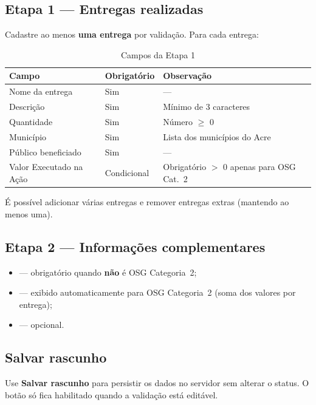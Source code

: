 \documentclass[11pt,a4paper]{article}
\begin{document}
\subsection{Etapa 1 — Entregas realizadas}

Cadastre ao menos \textbf{uma entrega} por validação. Para cada entrega:

\begin{table}[htbp]
  \centering
  \guiaTableStretch
  \caption{Campos da Etapa 1}
  \begin{tabularx}{\textwidth}{@{}L{4.2cm} C{2.4cm} Y@{}}
    \toprule
    \textbf{Campo} & \textbf{Obrigatório} & \textbf{Observação} \\
    \midrule
    Nome da entrega & Sim & --- \\
    Descrição & Sim & Mínimo de 3 caracteres \\
    Quantidade & Sim & Número $\geq$ 0 \\
    Município & Sim & Lista dos municípios do Acre \\
    Público beneficiado & Sim & --- \\
    Valor Executado na Ação & Condicional & Obrigatório $>$ 0 apenas para OSG Cat.~2 \\
    \bottomrule
  \end{tabularx}
\end{table}

É possível adicionar várias entregas e remover entregas extras (mantendo ao menos uma).

\subsection{Etapa 2 — Informações complementares}

\begin{itemize}
  \item {} — obrigatório quando \textbf{não} é OSG Categoria~2;
  \item {} — exibido automaticamente para OSG Categoria~2 (soma dos valores por entrega);
  \item {} — opcional.
\end{itemize}

\subsection{Salvar rascunho}

Use \textbf{Salvar rascunho} para persistir os dados no servidor sem alterar o status. O botão só fica habilitado quando a validação está editável.
\end{document}

